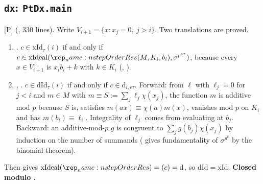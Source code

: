 \documentclass[11pt]{article}
\newcommand{\mP}{\textsf{[P]}}
\theoremstyle{remark}
\begin{document}
\subsection{\texttt{dx}: \texttt{PtDx.main}}
\mP{}  (, 330 lines). Write $V_{i+1}=\{x: x_j=0,\ j>i\}$. Two translations are proved.
\begin{enumerate}[nosep]
\item {}. $c\in\mathrm{xId}_\tau(i)$ if and only if $c\in\mathrm{xIdeal}(\lean{stepOrderRes}(M,K_i,b_i),\sigma^{p^{e\tau}})$, because every $x\in V_{i+1}$ is $x_i b_i+k$ with $k\in K_i$ (, ).
\item {}, . $c\in\mathrm{dId}_\tau(i)$ if and only if $c\in\mathrm{d}_{i,e\tau}$. Forward: from $\ell$ with $\ell_j=0$ for $j<i$ and $m\in M$ with $m\equiv S:=\sum_j\ell_j\chi(x_j)$, the function $m$ is additive mod $p$ because $S$ is, satisfies $m(ax)\equiv\chi(a)m(x)$, vanishes mod $p$ on $K_i$ and has $m(b_i)\equiv\ell_i$. Integrality of $\ell_j$ comes from evaluating at $b_j$. Backward: an additive-mod-$p$ $g$ is congruent to $\sum_j g(b_j)\chi(x_j)$ by induction on the number of summands ( gives fundamentality of $\sigma^{p^k}$ by the binomial theorem).
\end{enumerate}
Then  gives $\mathrm{xIdeal}(\lean{stepOrderRes})=(c)=\mathrm{d}$, so $\mathrm{dId}=\mathrm{xId}$. \textbf{Closed modulo .}
\end{document}
